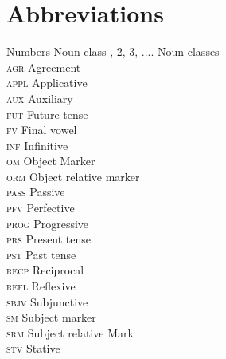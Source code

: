 \documentclass[output=paper,colorlinks,citecolor=brown]{langscibook}
\begin{document}
\section*{Abbreviations}
\begin{multicols}{2}
\begin{tabbing}
Numbers  \hspace{.5ex} \= Noun class   , 2, 3, .... \> Noun classes \\
\textsc{agr}   \> Agreement    \\ 
\textsc{appl}  \> Applicative  \\ 
\textsc{aux}   \> Auxiliary    \\ 
\textsc{fut}   \> Future tense \\ 
\textsc{fv}    \> Final vowel  \\ 
\textsc{inf}   \> Infinitive   \\ 
\textsc{om}    \> Object Marker\\ 
\textsc{orm}   \> Object relative marker\\
\textsc{pass}  \> Passive\\
\textsc{pfv}   \> Perfective   \\ 
\textsc{prog}  \> Progressive  \\ 
\textsc{prs}   \> Present tense\\
\textsc{pst}   \> Past tense\\
\textsc{recp}  \> Reciprocal\\
\textsc{refl}  \> Reflexive\\
\textsc{sbjv}  \> Subjunctive\\
\textsc{sm}    \> Subject marker\\
\textsc{srm}   \> Subject relative Mark\\
\textsc{stv}   \> Stative \\
\end{tabbing}
\end{multicols}

\printbibliography[heading=subbibliography,notkeyword=this]
\end{document}
